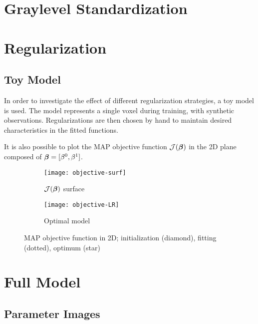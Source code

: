 \section{Graylevel Standardization}



\section{Regularization}


\subsection{Toy Model}\label{ss:toyreg}
In order to investigate the effect of different regularization strategies, a toy model is used. The model represents a single voxel during training, with synthetic observations. Regularizations are then chosen by hand to maintain desired characteristics in the fitted functions. 

\par
It is also possible to plot the MAP objective function $\mathcal{J}(\bm{\beta})$ in the 2D plane composed of $\bm{\beta} = [\beta^0,\beta^1]$.
\begin{figure}
  \centering
  \begin{subfigure}{\plotwidth}\centering\texttt{[image: objective-surf]}\caption{$\mathcal{J}(\bm{\beta})$ surface}\label{fig:obj-surf}\end{subfigure}
  \begin{subfigure}{\plotwidth}\centering\texttt{[image: objective-LR]}  \caption{Optimal model}\label{fig:obj-lr}\end{subfigure}
  \caption{MAP objective function in 2D; initialization (diamond), fitting (dotted), optimum (star)}
\end{figure}

\section{Full Model}
\subsection{Parameter Images}
